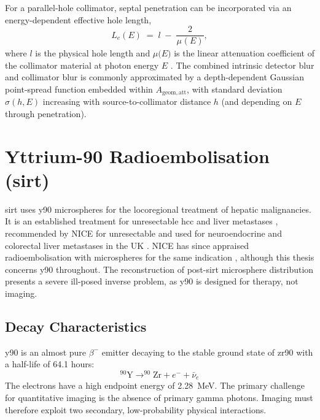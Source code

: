 For a parallel-hole collimator, septal penetration can be incorporated via an energy-dependent effective hole length,
\begin{equation}
    L_e(E) \;=\; l \;-\; \frac{2}{\mu_{\mathrm{}}(E)},
\end{equation}
where $l$ is the physical hole length and $\mu\mathrm(E)$ is the linear attenuation coefficient of the collimator material at photon energy $E$ \cite{cherryPhysicsNuclearMedicine2003}. The combined intrinsic detector blur and collimator blur is commonly approximated by a depth-dependent Gaussian point-spread function embedded within $A_{\mathrm{geom,att}}$, with standard deviation $\sigma(h,E)$ increasing with source-to-collimator distance $h$ (and depending on $E$ through penetration).

\section{Yttrium-90 Radioembolisation (\gls{sirt})}
\label{sec:y90}

\Gls{sirt} uses \gls{y90} microspheres for the locoregional treatment of hepatic malignancies. It is an established treatment for unresectable \gls{hcc} and liver metastases \cite{sundramSelectiveInternalRadiation2017}, recommended by NICE for unresectable  and used for neuroendocrine and colorectal liver metastases in the UK \cite{nationalinstituteforhealthandcareexcellenceniceSelectiveInternalRadiation2021}. NICE has since appraised radioembolisation with  microspheres for the same indication \cite{nationalinstituteforhealthandcareexcellenceniceSelectiveInternalRadiation2024}, although this thesis concerns \gls{y90} throughout. The reconstruction of post-\gls{sirt} microsphere distribution presents a severe ill-posed inverse problem, as \gls{y90} is designed for therapy, not imaging.

\subsection{Decay Characteristics}
\gls{y90} is an almost pure $\beta^-$ emitter decaying to the stable ground state of \gls{zr90} with a half-life of 64.1 hours:
\begin{equation}
    ^{90}\text{Y} \rightarrow ^{90}\text{Zr} + e^- + \bar{\nu}_e
\end{equation}
The electrons have a high endpoint energy of \SI{2.28}{\mega\electronvolt}. The primary challenge for quantitative imaging is the absence of primary gamma photons. Imaging must therefore exploit two secondary, low-probability physical interactions.

